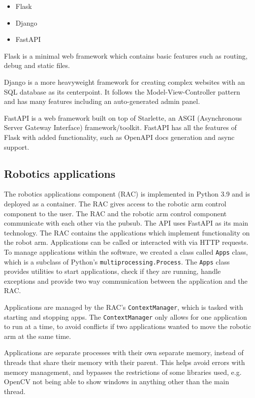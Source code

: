 \begin{itemize}
  \item Flask
  \item Django
  \item FastAPI
\end{itemize}

Flask is a minimal web framework which contains basic features such as routing, debug and static files.

Django is a more heavyweight framework for creating complex websites with an SQL database as its centerpoint. It follows the Model-View-Controller pattern and has many features including an auto-generated admin panel.

FastAPI is a web framework built on top of Starlette, an ASGI (Asynchronous Server Gateway Interface) framework/toolkit. FastAPI has all the features of Flask with added functionality, such as OpenAPI docs generation and async support.


\subsection{Robotics applications}

The robotics applications component (RAC) is implemented in Python 3.9 and is deployed as a container. The RAC gives access to the robotic arm control component to the user. The RAC and the robotic arm control component communicate with each other via the \Gls{pubsub}. The API uses FastAPI \cite{fastapi} as its main technology. The RAC contains the applications which implement functionality on the robot arm. Applications can be called or interacted with via HTTP requests. To manage applications within the software, we created a class called \lstinline{Apps} class, which is a subclass of Python's \lstinline{multiprocessing.Process}. The \lstinline{Apps} class provides utilities to start applications, check if they are running, handle exceptions and provide two way communication between the application and the RAC.

Applications are managed by the RAC's \lstinline{ContextManager}, which is tasked with starting and stopping apps. The \lstinline{ContextManager} only allows for one application to run at a time, to avoid conflicts if two applications wanted to move the robotic arm at the same time.

Applications are separate processes with their own separate memory, instead of threads that share their memory with their parent. This helps avoid errors with memory management, and bypasses the restrictions of some libraries used, e.g. OpenCV not being able to show windows in anything other than the main thread.

